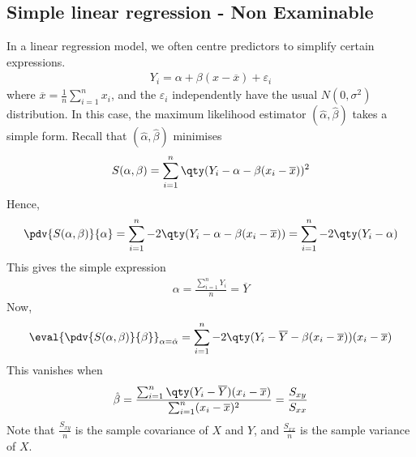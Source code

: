 \subsection{Simple linear regression - Non Examinable}
In a linear regression model, we often centre predictors to simplify certain expressions.
\begin{align*}
	Y_i = \alpha + \beta (x - \overline x) + \varepsilon_i
\end{align*}
where $\overline x = \frac{1}{n} \sum_{i=1}^n x_i$, and the $\varepsilon_i$ independently have the usual $N(0, \sigma^2)$ distribution.
In this case, the maximum likelihood estimator $(\hat \alpha, \hat \beta)$ takes a simple form.
Recall that $(\hat \alpha, \hat \beta)$ minimises
\begin{align*}
	S(\alpha, \beta) = \sum_{i=1}^n \qty(Y_i - \alpha - \beta(x_i - \overline x))^2
\end{align*}
Hence,
\begin{align*}
	\pdv{S(\alpha, \beta)}{\alpha} = \sum_{i=1}^n -2\qty(Y_i - \alpha - \beta(x_i - \overline x)) = \sum_{i=1}^n -2\qty(Y_i - \alpha)
\end{align*}
This gives the simple expression
\begin{align*}
	\alpha = \frac{\sum_{i=1}^n Y_i}{n} = \overline Y
\end{align*}
Now,
\begin{align*}
	\eval{\pdv{S(\alpha, \beta)}{\beta}}_{\alpha = \hat \alpha} = \sum_{i=1}^n -2\qty(Y_i - \overline Y - \beta(x_i - \overline x))(x_i - \overline x)
\end{align*}
This vanishes when
\begin{align*}
	\hat \beta = \frac{\sum_{i=1}^n \qty(Y_i - \overline Y)(x_i - \overline x)}{\sum_{i=1}^n (x_i - \overline x)^2} = \frac{S_{xy}}{S_{xx}}
\end{align*}
Note that $\frac{S_{xy}}{n}$ is the sample covariance of $X$ and $Y$, and $\frac{S_{xx}}{n}$ is the sample variance of $X$.
